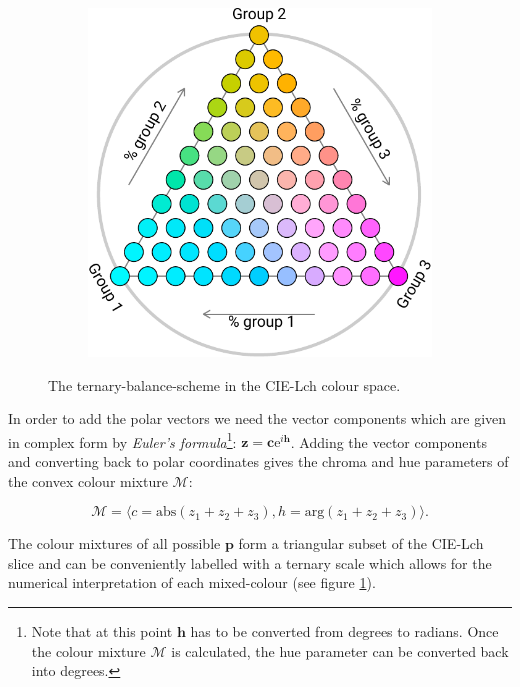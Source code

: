 \documentclass[parskip=half]{scrartcl}
\begin{document}
\begin{appendix}
\begin{figure}[!htb]
\begin{subfigure}[t]{0.4\textwidth}
  \includegraphics[width = \textwidth]{./fig/polar_ternary.pdf}
  \label{fig:poltern}
  \end{subfigure}
  \caption{The ternary-balance-scheme in the CIE-Lch colour space.}
  \label{fig:tern_construction}
\end{figure}

In order to add the polar vectors we need the vector components which are given in complex form by \emph{Euler's formula}\footnote{
  Note that at this point $\textbf{h}$ has to be converted from degrees to radians. Once the colour mixture $\mathscr{M}$ is calculated, the hue parameter can be converted back into degrees.
}: $\textbf{z}=\textbf{c}\text{e}^{i \textbf{h}}$. Adding the vector components and converting back to polar coordinates gives the chroma and hue parameters of the convex colour mixture $\mathscr{M}$:

\begin{equation*}
  \mathscr{M} =
  \langle c = \text{abs}(z_1 + z_2 + z_3),
  h = \text{arg}(z_1 + z_2 + z_3) \rangle.
\end{equation*}

The colour mixtures of all possible $\textbf{p}$ form a triangular subset of the CIE-Lch slice and can be conveniently labelled with a ternary scale which allows for the numerical interpretation of each mixed-colour (see figure \ref{fig:poltern}).


\end{appendix}
\end{document}

